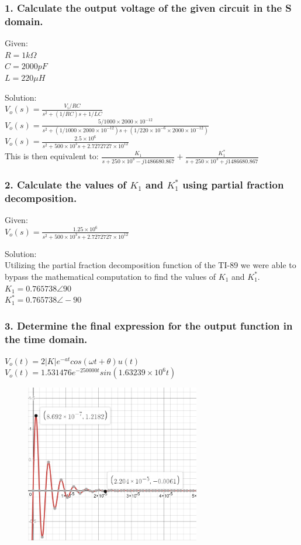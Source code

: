 \documentclass[11pt]{article}
\begin{document}
	\subsubsection*{1. Calculate the output voltage of the given circuit in the S domain.}
	\par{Given:}\\
	$R=1k\Omega$\\
	$C=2000 pF$\\
	$L=220\mu H$
	\par{Solution:}\\
	$V_{o}(s)= \frac{V_{i}/RC}{s^{2}+(1/RC)s+1/LC}$\\
	$V_{o}(s)= \frac{5/1000\times2000\times 10^{-12}}{s^{2}+(1/1000\times2000\times 10^{-12})s+(1/220\times10^{-6}\times2000\times 10^{-12})}$\\
	$V_{o}(s)= \frac{2.5\times10^{6}}{s^{2}+500\times10^{3}s+2.7272727\times10^{12}}$\\
	This is then equivalent to:
	$\frac{K_{1}}{s+250\times 10^{3}-j1486680.867}+\frac{K^{*}_{1}}{s+250\times 10^{3}+j1486680.867}$
	\subsubsection*{2. Calculate the values of $K_{1}$ and $K^{*}_{1}$ using partial fraction decomposition.}
	\par{Given:}\\
	$V_{o}(s)= \frac{1.25\times10^{6}}{s^{2}+500\times10^{3}s+2.7272727\times10^{12}}$\\
	\par{Solution:}\\
	Utilizing the partial fraction decomposition function of the TI-89 we were able to bypass the mathematical computation to find the values of $K_{1}$ and $K^{*}_{1}$.\\
	$K_{1}=0.765738\angle90$\\
	$K^{*}_{1}=0.765738\angle-90$\\
	\subsubsection*{3. Determine the final expression for the output function in the time domain.}
	$V_{o}(t)=2|K|e^{-at}cos(\omega t+\theta)u(t)$\\
	$V_{o}(t)=1.531476e^{-250000t}sin(1.63239\times 10^{6}t)$\\
	\begin{figure}[H]
	\centering
	\includegraphics[width=3in]{images/Function_Graph.png}
	\end{figure}
	
\end{document}
